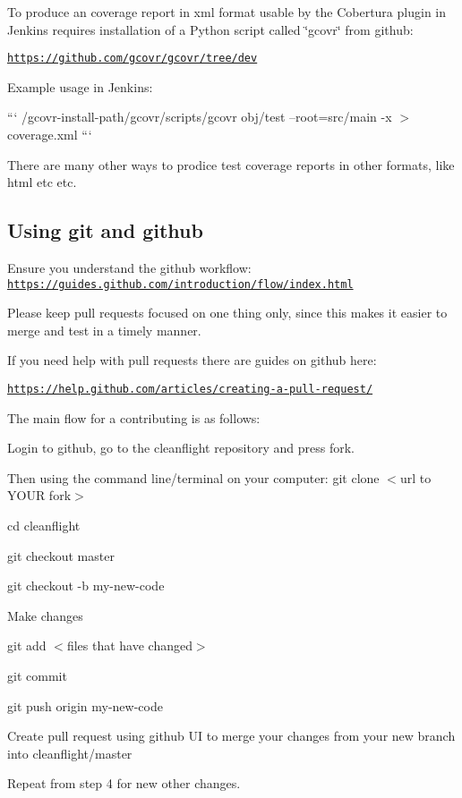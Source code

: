 To produce an coverage report in xml format usable by the Cobertura plugin in Jenkins requires installation of a Python script called \char`\"{}gcovr\char`\"{} from github\+:

\href{https://github.com/gcovr/gcovr/tree/dev}{\tt https\+://github.\+com/gcovr/gcovr/tree/dev}

Example usage in Jenkins\+:

``` /gcovr-\/install-\/path/gcovr/scripts/gcovr obj/test --root=src/main -\/x $>$ coverage.\+xml ```

There are many other ways to prodice test coverage reports in other formats, like html etc etc.

\subsection*{Using git and github}

Ensure you understand the github workflow\+: \href{https://guides.github.com/introduction/flow/index.html}{\tt https\+://guides.\+github.\+com/introduction/flow/index.\+html}

Please keep pull requests focused on one thing only, since this makes it easier to merge and test in a timely manner.

If you need help with pull requests there are guides on github here\+:

\href{https://help.github.com/articles/creating-a-pull-request/}{\tt https\+://help.\+github.\+com/articles/creating-\/a-\/pull-\/request/}

The main flow for a contributing is as follows\+:


\begin{DoxyEnumerate}
\item Login to github, go to the cleanflight repository and press {\ttfamily fork}.
\item Then using the command line/terminal on your computer\+: {\ttfamily git clone $<$url to Y\+O\+U\+R fork$>$}
\item {\ttfamily cd cleanflight}
\item {\ttfamily git checkout master}
\item {\ttfamily git checkout -\/b my-\/new-\/code}
\item Make changes
\item {\ttfamily git add $<$files that have changed$>$}
\item {\ttfamily git commit}
\item {\ttfamily git push origin my-\/new-\/code}
\item Create pull request using github U\+I to merge your changes from your new branch into {\ttfamily cleanflight/master}
\item Repeat from step 4 for new other changes.
\end{DoxyEnumerate}

